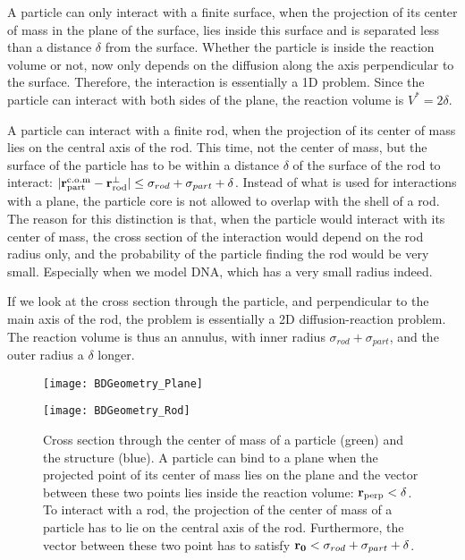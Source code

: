 A particle can only interact with a finite surface, when the projection of its center of mass in the plane of the surface, lies inside this surface and is separated less than a distance $\delta$ from the surface. Whether the particle is inside the reaction volume or not, now only depends on the diffusion along the axis perpendicular to the surface. Therefore, the interaction is essentially a 1D problem. Since the particle can interact with both sides of the plane, the reaction volume is $V^*=2 \delta$.

A particle can interact with a finite rod, when the projection of its center of mass lies on the central axis of the rod. This time, not the center of mass, but the surface of the particle has to be within a distance $\delta$ of the surface of the rod to interact: $|{\bf r}_{\rm part}^{\rm c.o.m}-{\bf r}_{\rm rod}^{\perp}| \leq \sigma_{rod}+\sigma_{part} + \delta$. Instead of what is used for interactions with a plane, the particle core is not allowed to overlap with the shell of a rod. The reason for this distinction is that, when the particle would interact with its center of mass, the cross section of the interaction would depend on the rod radius only, and the probability of the particle finding the rod would be very small. Especially when we model DNA, which has a very small radius indeed.

If we look at the cross section through the particle, and perpendicular to the main axis of the rod, the problem is essentially a 2D diffusion-reaction problem. The reaction volume is thus an annulus, with inner radius $\sigma_{rod} + \sigma_{part}$, and the outer radius a $\delta$ longer.

\begin{figure}[ht]
\begin{minipage}[ht]{.5\linewidth}
\centering
\texttt{[image: BDGeometry\_Plane]}
\end{minipage}
\begin{minipage}[ht]{.5\linewidth}
\centering
\texttt{[image: BDGeometry\_Rod]}
\end{minipage}
\caption{ Cross section through the center of mass of a particle (green) and the structure (blue). A particle can bind to a plane when the projected point of its center of mass lies on the plane and the vector between these two points lies inside the reaction volume: ${\bf r}_{\rm perp}<\delta$. To interact with a rod, the projection of the center of mass of a particle has to lie on the central axis of the rod. Furthermore, the vector between these two point has to satisfy ${\bf r_0} < \sigma_{rod} + \sigma_{part} + \delta$.}
\end{figure}



